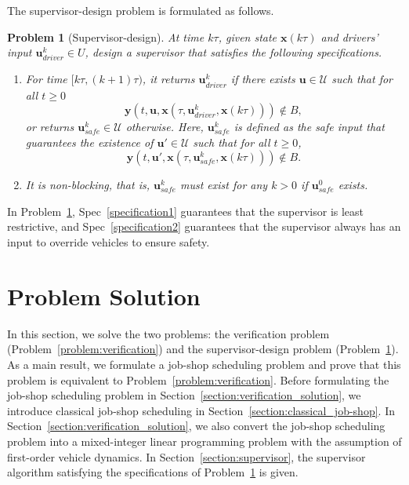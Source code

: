 \documentclass{sig-alternate}
\newtheorem{problem}{Problem}
\begin{document}
The supervisor-design problem is formulated as follows.
\begin{problem}[Supervisor-design]\label{problem:supervisor}
	At time $k\tau$, given state $\mathbf{x}(k\tau)$ and drivers' input $\mathbf{u}_{driver}^k\in U$, design a supervisor that satisfies the following specifications.
	\begin{enumerate}[{Spec} 1.]
		\item For time $[k\tau, (k+1)\tau)$, it returns $\mathbf{u}_{driver}^k$ if there exists $\mathbf{u}\in\mathcal{U}$ such that for all $t\geq 0$ $$\mathbf{y}(t,\mathbf{u},\mathbf{x}(\tau, \mathbf{u}_{driver}^k,\mathbf{x}(k\tau)))\notin B,$$ or returns $\mathbf{u}_{safe}^k\in\mathcal{U}$ otherwise. Here, $\mathbf{u}_{safe}^k$ is defined as the safe input that guarantees the existence of $\mathbf{u}'\in\mathcal{U}$ such that for all $t\geq 0$, \begin{equation}\label{equation:safe_input_definition}
		\mathbf{y}(t,\mathbf{u}',\mathbf{x}(\tau, \mathbf{u}^k_{safe},\mathbf{x}(k\tau)))\notin B.
		\end{equation} \label{specification1}
		\item It is non-blocking, that is, $\mathbf{u}_{safe}^k$ must exist for any $k>0$ if $\mathbf{u}_{safe}^0$ exists.\label{specification2}
	\end{enumerate}
\end{problem}	

In Problem~\ref{problem:supervisor}, Spec~\ref{specification1} guarantees that the supervisor is least restrictive, and Spec~\ref{specification2} guarantees that the supervisor always has an input to override vehicles to ensure safety.

\section{Problem Solution}\label{section:problem_solution}
In this section, we solve the two problems: the verification problem (Problem~\ref{problem:verification}) and the supervisor-design problem (Problem~\ref{problem:supervisor}). As a main result, we formulate a job-shop scheduling problem and prove that this problem is equivalent to Problem~\ref{problem:verification}. Before formulating the job-shop scheduling problem in Section~\ref{section:verification_solution}, we introduce classical job-shop scheduling in Section~\ref{section:classical_job-shop}. In Section~\ref{section:verification_solution}, we also convert the job-shop scheduling problem into a mixed-integer linear programming problem with the assumption of first-order vehicle dynamics. In Section~\ref{section:supervisor}, the supervisor algorithm satisfying the specifications of Problem~\ref{problem:supervisor} is given.
\end{document}
